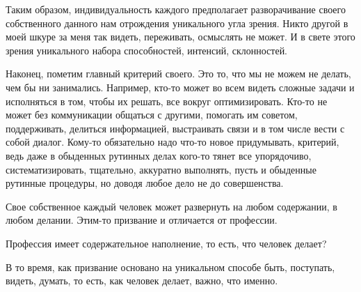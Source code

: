 Таким образом, индивидуальность каждого предполагает разворачивание своего
собственного данного нам отрождения уникального угла зрения. Никто другой в моей
шкуре за меня так видеть, переживать, осмыслять не может. И в свете этого зрения
уникального набора способностей, интенсий, склонностей. 

Наконец, пометим главный
критерий своего. Это то, что мы не можем не делать, чем бы ни занимались.
Например, кто-то может во всем видеть сложные задачи и исполняться в том, чтобы
их решать, все вокруг оптимизировать. Кто-то не может без коммуникации общаться
с другими, помогать им советом, поддерживать, делиться информацией, выстраивать
связи и в том числе вести с собой диалог. Кому-то обязательно надо что-то новое
придумывать, критерий, ведь даже в обыденных рутинных делах кого-то тянет все
упорядочиво, систематизировать, тщательно, аккуратно выполнять, пусть и
обыденные рутинные процедуры, но доводя любое дело не до совершенства. 

Свое собственное каждый человек может развернуть на
любом содержании, в любом делании. Этим-то призвание и отличается от профессии.

Профессия имеет содержательное наполнение, то есть, что человек делает? 

В то время, как призвание
основано на уникальном способе быть, поступать, видеть, думать, то есть, как
человек делает, важно, что именно. 

